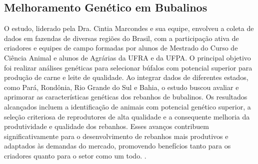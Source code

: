 \subsection*{Melhoramento Genético em Bubalinos}
O estudo, liderado pela Dra. Cintia Marcondes e sua equipe, envolveu a coleta de dados em fazendas de diversas regiões do Brasil, com a participação ativa de criadores e equipes de campo formadas por alunos de Mestrado do Curso de Ciência Animal e alunos de Agrárias da UFRA e da UFPA. O principal objetivo foi realizar análises genéticas para selecionar búfalos com potencial superior para produção de carne e leite de qualidade. Ao integrar dados de diferentes estados, como Pará, Rondônia, Rio Grande do Sul e Bahia, o estudo buscou avaliar e aprimorar as características genéticas dos rebanhos de bubalinos. Os resultados alcançados incluem a identificação de animais com potencial genético superior, a seleção criteriosa de reprodutores de alta qualidade e a consequente melhoria da produtividade e qualidade dos rebanhos. Esses avanços contribuem significativamente para o desenvolvimento de rebanhos mais produtivos e adaptados às demandas do mercado, promovendo benefícios tanto para os criadores quanto para o setor como um todo.
\cite{Ribamar.J}.